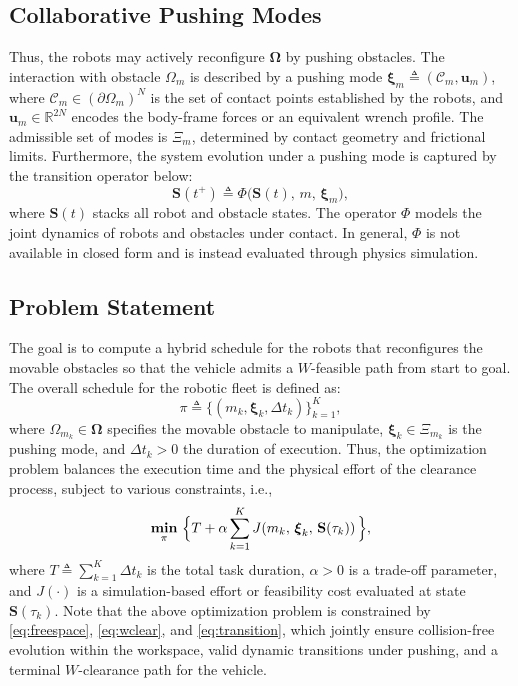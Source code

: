 \subsection{Collaborative Pushing Modes}\label{ss:interaction_mode}
Thus, the robots may actively reconfigure $\boldsymbol{\Omega}$ by pushing obstacles.
The interaction with obstacle $\Omega_m$ is described by a pushing mode
$\boldsymbol{\xi}_m\triangleq(\mathcal{C}_m,\mathbf{u}_m)$,
where $\mathcal{C}_m\in(\partial\Omega_m)^N$ is the set of contact points
established by the robots, and $\mathbf{u}_m\in\mathbb{R}^{2N}$ encodes the body-frame forces
or an equivalent wrench profile. The admissible set of
modes is $\Xi_m$, determined by contact geometry and frictional limits.
Furthermore, the system evolution under a pushing mode
is captured by the transition operator below:
\begin{equation}\label{eq:transition}
  \mathbf{S}(t^+)\triangleq\Phi\big(\mathbf{S}(t),\,m,\,\boldsymbol{\xi}_m\big),
\end{equation}
where $\mathbf{S}(t)$ stacks all robot and obstacle states. The operator
$\Phi$ models the joint dynamics of robots and obstacles under contact. In
general, $\Phi$ is not available in closed form and is instead evaluated
through physics simulation.

\subsection{Problem Statement}\label{subsec:objective}
The goal is to compute a hybrid schedule for the robots that reconfigures the movable
obstacles so that the vehicle admits a $W$-feasible path from start to goal.
The overall schedule for the robotic fleet is defined as:
\begin{equation}\label{eq:schedule}
\pi\triangleq\big\{(m_k,\boldsymbol{\xi}_k,\Delta t_k)\big\}_{k=1}^{K},
\end{equation}
where $\Omega_{m_k}\in \boldsymbol{\Omega}$ specifies the movable obstacle to manipulate,
$\boldsymbol{\xi}_k\in\Xi_{m_k}$ is the pushing mode, and
$\Delta t_k>0$ the duration of execution.
Thus, the optimization problem balances the execution time and the physical effort
of the clearance process, subject to various constraints, i.e.,
\begin{equation}\label{eq:problem}
\underset{\pi}{\textbf{min}}\ \Big{\{} T+\alpha\sum_{k=1}^{K}
J\!\left(m_k,\,\boldsymbol{\xi}_k,\,\mathbf{S}(\tau_k)\right)\Big{\}},
\end{equation}
where $T\triangleq\sum_{k=1}^{K}\Delta t_k$ is the total task duration,
$\alpha>0$ is a trade-off parameter, and $J(\cdot)$ is a simulation-based
effort or feasibility cost evaluated at state $\mathbf{S}(\tau_k)$.
Note that the above optimization
problem is constrained by \eqref{eq:freespace}, \eqref{eq:wclear}, and
\eqref{eq:transition}, which jointly ensure collision-free evolution within
the workspace, valid dynamic transitions under pushing, and a terminal
$W$-clearance path for the vehicle.

